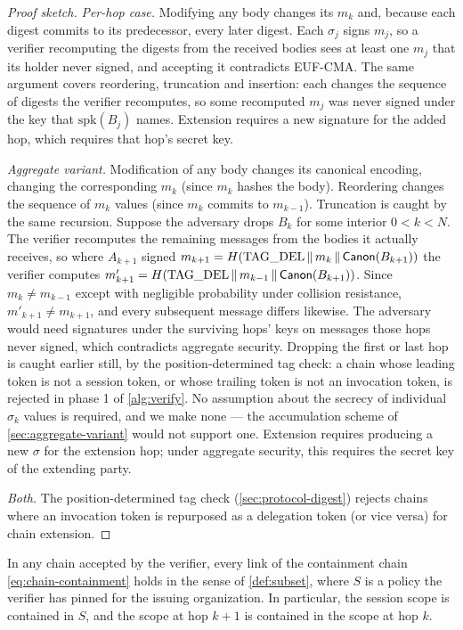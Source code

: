 \documentclass[11pt,a4paper]{article}
\begin{document}
\begin{proof}[Proof sketch]
\emph{Per-hop case.} Modifying any body changes its $m_k$ and, because
each digest commits to its predecessor, every later digest. Each
$\sigma_j$ signs $m_j$, so a verifier recomputing the digests from the
received bodies sees at least one $m_j$ that its holder never signed,
and accepting it contradicts EUF-CMA. The same argument covers
reordering, truncation and insertion: each changes the sequence of
digests the verifier recomputes, so some recomputed $m_j$ was never
signed under the key that $\mathrm{spk}(B_j)$ names. Extension requires
a new signature for the added hop, which requires that hop's secret key.

\emph{Aggregate variant.} Modification of any body changes its
canonical encoding, changing the corresponding $m_k$ (since $m_k$
hashes the body). Reordering changes the sequence of $m_k$ values (since
$m_k$ commits to $m_{k-1}$). Truncation is caught by the same
recursion. Suppose the adversary drops
$B_k$ for some interior $0 < k < N$. The verifier recomputes the
remaining messages from the bodies it actually receives, so where
$A_{k+1}$ signed
$m_{k+1} = H(\text{TAG\_DEL} \,\|\, m_k \,\|\, \mathsf{Canon}(B_{k+1}))$ the
verifier computes
$m'_{k+1} = H(\text{TAG\_DEL} \,\|\, m_{k-1} \,\|\, \mathsf{Canon}(B_{k+1}))$.
Since $m_k \neq m_{k-1}$ except with negligible probability under
collision resistance, $m'_{k+1} \neq m_{k+1}$, and every subsequent
message differs likewise. The adversary would need signatures under the
surviving hops' keys on messages those hops never signed, which
contradicts aggregate security. Dropping the first or last hop is
caught earlier still, by the position-determined tag check: a chain
whose leading token is not a session token, or whose trailing token is
not an invocation token, is rejected in phase 1 of \cref{alg:verify}.
No assumption about the secrecy of individual $\sigma_k$ values is
required, and we make none --- the accumulation scheme of
\cref{sec:aggregate-variant} would not support one. Extension requires
producing a new $\sigma$ for the extension hop; under aggregate
security, this requires the secret key of the extending party.

\emph{Both.} The position-determined tag check
(\cref{sec:protocol-digest}) rejects chains where an invocation token is
repurposed as a delegation token (or vice versa) for chain extension.
\end{proof}

\begin{theorem}
\label{thm:scope-monotonicity}
In any chain accepted by the verifier, every link of the containment
chain \cref{eq:chain-containment} holds in the sense of
\cref{def:subset}, where $S$ is a policy the verifier has pinned for the
issuing organization. In particular, the session scope is contained in
$S$, and the scope at hop $k+1$ is contained in the scope at hop $k$.
\end{theorem}
\end{document}
